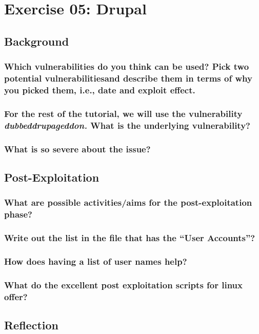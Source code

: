\section*{Exercise 05: Drupal}
\subsection*{Background}
\subsubsection*{Which vulnerabilities do you think can be used? Pick two potential vulnerabilitiesand describe them in terms of why you picked them, i.e., date and exploit effect.}
\subsubsection*{For the rest of the tutorial, we will use the vulnerability \textit{dubbeddrupageddon.} What is the underlying vulnerability?}
\subsubsection*{What is so severe about the issue?}

\subsection*{Post-Exploitation}

\subsubsection*{What are possible activities/aims for the post-exploitation phase?}
\subsubsection*{Write out the list in the file that has the “User Accounts”?}
\subsubsection*{How does having a list of user names help?}
\subsubsection*{What do the excellent post exploitation scripts for linux offer?}

\subsection*{Reflection}

